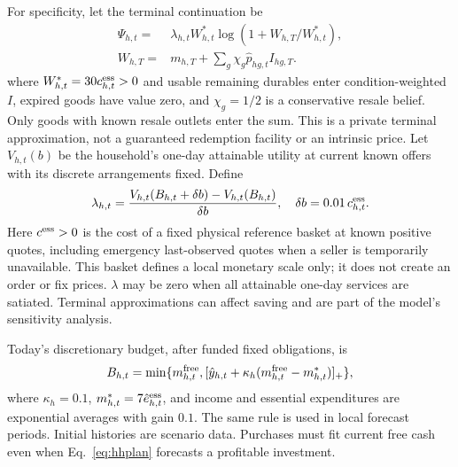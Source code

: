 \documentclass[10pt,a4paper,twocolumn]{article}
\begin{document}
For specificity, let the terminal continuation be
\begin{equation}
\begin{aligned}
 \Psi_{h,t}={}&\lambda_{h,t}W^*_{h,t}
 \log(1+W_{h,T}/W^*_{h,t}),\\
 W_{h,T}={}&m_{h,T}+\sum_g\chi_g\hat p_{hg,t}I_{hg,T}.
\end{aligned}
\label{eq:terminal}
\end{equation}
where $W^*_{h,t}=30c^{\rm ess}_{h,t}>0$ and usable remaining durables enter condition-weighted $I$, expired
goods have value zero, and $\chi_g=1/2$ is a conservative resale belief.
Only goods with known resale outlets enter the sum. This is a private
terminal approximation, not a guaranteed redemption facility or an
intrinsic price. Let $V_{h,t}(b)$ be the household's one-day attainable
utility at current known offers with its discrete arrangements fixed.
Define
\begin{equation}
 \lambda_{h,t}=
 \frac{V_{h,t}(B_{h,t}+\delta b)-V_{h,t}(B_{h,t})}{\delta b},
 \quad \delta b=0.01\,c_{h,t}^{\rm ess}.
 \label{eq:lambda}
\end{equation}
Here $c^{\rm ess}>0$ is the cost of a fixed physical reference basket at
known positive quotes, including emergency last-observed quotes when a
seller is temporarily unavailable. This basket defines a local monetary
scale only; it does not create an order or fix prices. $\lambda$ may be
zero when all attainable one-day services are satiated. Terminal
approximations can affect saving and are part of the model's sensitivity
analysis.

Today's discretionary budget, after funded fixed obligations, is
\begin{equation}
 B_{h,t}=\min\{m^{\rm free}_{h,t},
 [\hat y_{h,t}+\kappa_h(m^{\rm free}_{h,t}-m^*_{h,t})]_+\},
 \label{eq:budget}
\end{equation}
where $\kappa_h=0.1$, $m^*_{h,t}=7\hat e^{\rm ess}_{h,t}$, and income
and essential expenditures are exponential averages with gain $0.1$.
The same rule is used in local forecast periods. Initial histories are
scenario data. Purchases must fit current free cash even when
Eq.~\eqref{eq:hhplan} forecasts a profitable investment.
\end{document}
